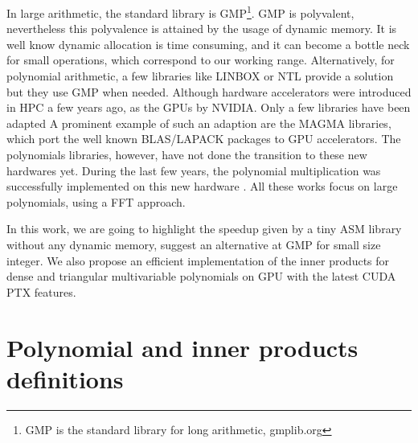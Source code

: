 \documentclass[oribibl]{llncs2e/llncs}
\begin{document}
In large arithmetic, the standard library is GMP\footnote{GMP is the standard library for long arithmetic, gmplib.org}. GMP is polyvalent, nevertheless this polyvalence is attained by the usage of  dynamic memory.
It is well know dynamic allocation is time consuming, and it can become a bottle neck for small operations, which correspond to our working range.  
Alternatively, for polynomial arithmetic, a few libraries like  LINBOX or NTL  provide a solution but  they use GMP when needed. 
Although hardware accelerators were introduced  in HPC a few years ago, as the GPUs  by NVIDIA. Only a few libraries have been adapted 
A prominent example of such an adaption are the MAGMA libraries, which port the well known BLAS/LAPACK packages to GPU accelerators.
The polynomials libraries, however,  have not done the transition to these new hardwares yet.
During the last few years, the polynomial multiplication was successfully implemented on this new hardware
\cite{Govindaraju2008, Emeliyanenko:2009, Moreno2010}. All these works focus on large polynomials, using a FFT approach. 

In this work, we are going to highlight the speedup given by a tiny ASM library without any dynamic memory,  suggest an alternative at GMP for small size integer. 
We also propose an efficient implementation of the inner products for  dense and triangular multivariable polynomials  on GPU with the latest CUDA PTX features.  


\section{Polynomial and inner products definitions}
\end{document}
